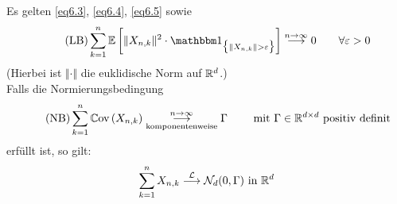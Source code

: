 \begin{satz}\label{satz6.2MultivariaterZGWS}\enter
Es gelten \eqref{eq6.3}, \eqref{eq6.4}, \eqref{eq6.5} sowie
\begin{align}\label{eqSatz6.2LB}\tag{LB}
\sum\limits_{k=1}^n\E\left[\Vert X_{n,k}\Vert^2\cdot\indi_{\big\lbrace\Vert X_{n,k}\Vert>\varepsilon\big\rbrace}\right]\stackrel{n\to\infty}{\longrightarrow}0\qquad\forall\varepsilon>0
\end{align}
(Hierbei ist $\Vert\cdot\Vert$ die euklidische Norm auf $\mathbb{R}^d$.)\\
Falls die Normierungsbedingung
\begin{align}\label{eqSatz6.2NB}\tag{NB}
\sum\limits_{k=1}^n\mathbb{C}\text{ov}\left(X_{n,k}\right)\underset{\text{komponentenweise}}{\overset{n\to\infty}{\longrightarrow}}\Gamma\qquad\text{ mit }\Gamma\in\mathbb{R}^{d\times d}\text{ positiv definit}
\end{align}
erfüllt ist, so gilt:
\begin{align*}
\sum\limits_{k=1}^n X_{n,k}\stackrel{\mathcal{L}}{\longrightarrow}\mathcal{N}_d(0,\Gamma)\text{ in }\mathbb{R}^d
\end{align*}
\end{satz}
